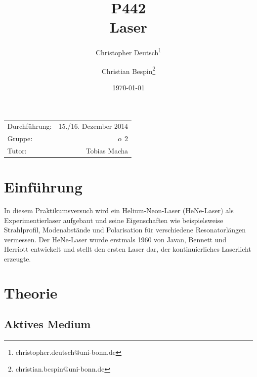 \documentclass[11pt, a4paper]{article}
\title{P442 \\ Laser}
\author{Christopher Deutsch\footnote{christopher.deutsch@uni-bonn.de} \and Christian Bespin\footnote{christian.bespin@uni-bonn.de}}
\date{\today}
\numberwithin{equation}{section}
\begin{document}
\begin{titlepage}

\maketitle

\begin{center}
\begin{tabular}{l r}
Durchführung: & 15./16. Dezember 2014 \\
Gruppe: & $\alpha$ 2 \\
Tutor: & Tobias Macha
\end{tabular}
\end{center}

\begin{abstract}
\noindent

\end{abstract}

\end{titlepage}

\tableofcontents
\newpage


\section{Einführung}

In diesem Praktikumsversuch wird ein Helium-Neon-Laser (HeNe-Laser) als Experimentierlaser aufgebaut und seine Eigenschaften wie beispielsweise Strahlprofil, Modenabstände und Polarisation für verschiedene Resonatorlängen vermessen.
Der HeNe-Laser wurde erstmals 1960 von Javan, Bennett und Herriott \cite{javan} entwickelt und stellt den ersten Laser dar, der kontinuierliches Laserlicht erzeugte.

\section{Theorie}

\subsection{Aktives Medium}
\end{document}
